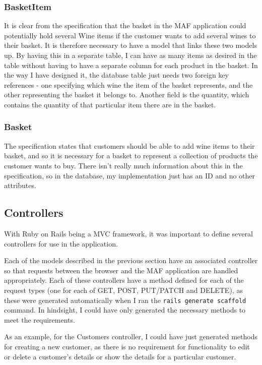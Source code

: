 \documentclass[a4paper,12pt,hidelinks]{report}
\begin{document}
    \subsubsection{BasketItem}
    It is clear from the specification that the basket in the MAF application could potentially hold several Wine items if the customer wants to add
    several wines to their basket. It is therefore necessary to have a model that links these two models up. By having this in a separate table, I
    can have as many items as desired in the table without having to have a separate column for each product in the basket. In the way I have designed it,
    the database table just needs two foreign key references - one specifying which wine the item of the basket represents, and the other representing the
    basket it belongs to. Another field is the quantity, which contains the quantity of that particular item there are in the basket.

    \subsubsection{Basket}
    The specification states that customers should be able to add wine items to their basket, and so it is necessary for a basket to represent
    a collection of products the customer wants to buy. There isn't really much information about this in the specification, so in the database,
    my implementation just has an ID and no other attributes.

    \subsection{Controllers}
    With Ruby on Rails being a MVC framework, it was important to define several controllers for use in the application.

    Each of the models described in the previous section have an associated controller so that requests between the browser and the MAF
    application are handled appropriately. Each of these controllers have a method defined for each of the request types (one for each of GET, POST, 
    PUT/PATCH and DELETE), as these were generated automatically when I ran the \texttt{rails generate scaffold} command. In hindsight, I could have
    only generated the necessary methods to meet the requirements.

    As an example, for the Customers controller, I could have just generated methods for creating a new customer, as there is no requirement 
    for functionality to edit or delete a customer's details or show the details for a particular customer. 
    
\end{document}
